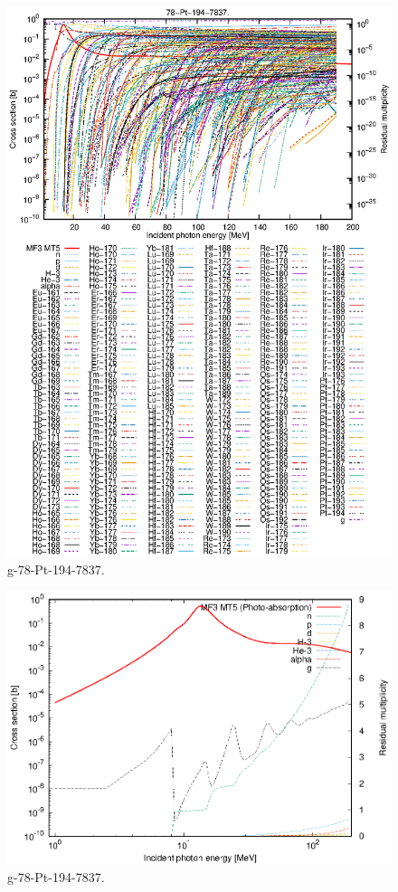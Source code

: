 \begin{figure}
 \includegraphics[width=\linewidth]{eps/g_78-Pt-194_7837.eps}
  \caption{g-78-Pt-194-7837.}
\end{figure}
\newpage \clearpage

\begin{figure}
 \includegraphics[width=\linewidth]{eps-log/g_78-Pt-194_7837.eps}
 \caption{g-78-Pt-194-7837.}
\end{figure}
\newpage \clearpage

